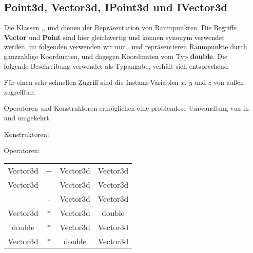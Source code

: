 
\subsection{Point3d, Vector3d, IPoint3d und IVector3d}
\hypertarget{Point3d}{}
\hypertarget{Vector3d}{}
\hypertarget{IPoint3d}{}
\hypertarget{IVector3d}{}
Die Klassen ,,  
und  dienen der Repräsentation von Raumpunkten. 
Die Begriffe {\bf Vector} und {\bf Point} sind hier gleichwertig 
und können synonym verwendet werden, im folgenden verwenden wir nur 
. 
 und  repräsentieren Raumpunkte durch 
ganzzahlige Koordinaten,   und  
dagegen Koordinaten vom Typ {\bf double}. Die folgende Beschreibung 
verwendet  als Typangabe,  verhält 
sich entsprechend.

Für einen sehr schnellen Zugriff sind die Instanz-Variablen 
$x$, $y$ und $z$ von außen zugreifbar. 

Operatoren und Konstruktoren ermöglichen eine problemlose Umwandlung 
von  in  und umgekehrt.

Konstruktoren:




Operatoren:
\begin{center}
\begin{tabular}{ccc@{=}c}
Vector3d & + & Vector3d & Vector3d\\
Vector3d & - & Vector3d & Vector3d\\
 & - & Vector3d & Vector3d\\
Vector3d & * & Vector3d & double \\
double & * & Vector3d & Vector3d \\
Vector3d & * & double & Vector3d \\
\end{tabular}
\end{center}


